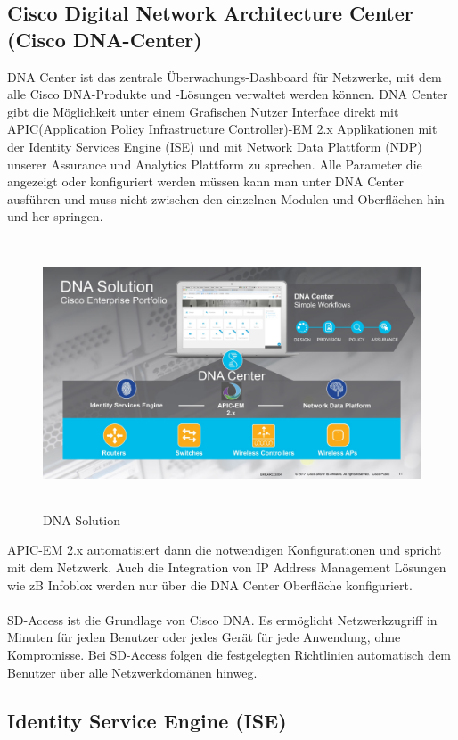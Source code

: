 \subsection{Cisco Digital Network Architecture Center (Cisco DNA-Center)}
DNA Center ist das zentrale Überwachungs-Dashboard für Netzwerke, mit dem alle Cisco DNA-Produkte und -Lösungen verwaltet werden können.
DNA Center gibt die Möglichkeit unter einem Grafischen Nutzer Interface direkt mit APIC(Application Policy Infrastructure Controller)-EM 2.x Applikationen mit der Identity Services Engine (ISE) und mit Network Data Plattform (NDP) unserer Assurance und Analytics Plattform zu sprechen. Alle Parameter die angezeigt oder konfiguriert werden müssen kann man unter DNA Center ausführen und muss nicht zwischen den einzelnen Modulen und Oberflächen hin und her springen.
\begin{figure}[H]
	\centering
	\includegraphics[height=8cm]{img/DNAC-1.jpg}
	\caption{DNA Solution}
	\label{fig:Aufbau einer DNA Solution}
\end{figure}
APIC-EM 2.x automatisiert dann die notwendigen Konfigurationen und spricht mit dem Netzwerk. Auch die Integration von IP Address Management Lösungen wie zB Infoblox werden nur über die DNA Center Oberfläche konfiguriert. \\
\\
SD-Access ist die Grundlage von Cisco DNA. Es ermöglicht Netzwerkzugriff in Minuten für jeden Benutzer oder jedes Gerät für jede Anwendung, ohne Kompromisse. Bei SD-Access folgen die festgelegten Richtlinien automatisch dem Benutzer über alle Netzwerkdomänen hinweg.

\subsection{Identity Service Engine (ISE)}

